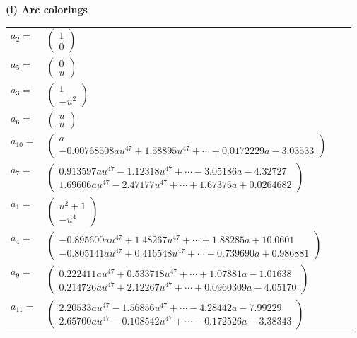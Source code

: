 \documentclass[1p]{elsarticle_modified}
\theoremstyle{definition}
\begin{document}
\flushleft \textbf{(i) Arc colorings}\\
\begin{tabular}{m{7pt} m{180pt} m{7pt} m{180pt} }
\flushright $a_{2}=$&$\begin{pmatrix}1\\0\end{pmatrix}$ \\
\flushright $a_{5}=$&$\begin{pmatrix}0\\u\end{pmatrix}$ \\
\flushright $a_{3}=$&$\begin{pmatrix}1\\- u^2\end{pmatrix}$ \\
\flushright $a_{6}=$&$\begin{pmatrix}u\\u\end{pmatrix}$ \\
\flushright $a_{10}=$&$\begin{pmatrix}a\\-0.00768508 a u^{47}+1.58895 u^{47}+\cdots+0.0172229 a-3.03533\end{pmatrix}$ \\
\flushright $a_{7}=$&$\begin{pmatrix}0.913597 a u^{47}-1.12318 u^{47}+\cdots-3.05186 a-4.32727\\1.69606 a u^{47}-2.47177 u^{47}+\cdots+1.67376 a+0.0264682\end{pmatrix}$ \\
\flushright $a_{1}=$&$\begin{pmatrix}u^2+1\\- u^4\end{pmatrix}$ \\
\flushright $a_{4}=$&$\begin{pmatrix}-0.895600 a u^{47}+1.48267 u^{47}+\cdots+1.88285 a+10.0601\\-0.805141 a u^{47}+0.416548 u^{47}+\cdots-0.739690 a+0.986881\end{pmatrix}$ \\
\flushright $a_{9}=$&$\begin{pmatrix}0.222411 a u^{47}+0.533718 u^{47}+\cdots+1.07881 a-1.01638\\0.214726 a u^{47}+2.12267 u^{47}+\cdots+0.0960309 a-4.05170\end{pmatrix}$ \\
\flushright $a_{11}=$&$\begin{pmatrix}2.20533 a u^{47}-1.56856 u^{47}+\cdots-4.28442 a-7.99229\\2.65700 a u^{47}-0.108542 u^{47}+\cdots-0.172526 a-3.38343\end{pmatrix}$ \\

\end{tabular}
\end{document}
